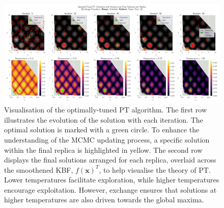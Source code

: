 \documentclass[10pt]{article}
\begin{document}
\begin{figure}[H]
    \centering
    \includegraphics[width=1\textwidth]{../figures/Permanent Images/PT_Optimal_Tuning.png}
    \captionsetup{justification=centering}
    \caption{Visualisation of the optimally-tuned PT algorithm. The first row illustrates the evolution of the solution with each iteration. The optimal solution is marked with a green circle. To enhance the understanding of the MCMC updating process, a specific solution within the final replica is highlighted in yellow. The second row displays the final solutions arranged for each replica, overlaid across the smoothened KBF, $f(\mathbf{x})^T$, to help visualise the theory of PT. Lower temperatures facilitate exploration, while higher temperatures encourage exploitation. However, exchange ensures that solutions at higher temperatures are also driven towards the global maxima.}
    \label{fig:PToptimal_evo}
\end{figure}
\end{document}
